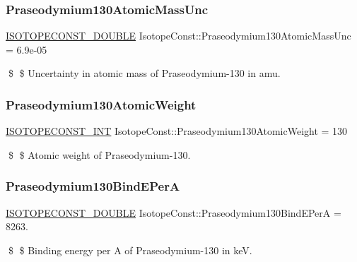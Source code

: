 \subsubsection{\texorpdfstring{Praseodymium130\+Atomic\+Mass\+Unc}{Praseodymium130AtomicMassUnc}}
{\footnotesize\ttfamily \mbox{\hyperlink{group___isotope_const-_macros_ga8f45a7272ce02c0b4c65c44636ed719a}{I\+S\+O\+T\+O\+P\+E\+C\+O\+N\+S\+T\+\_\+\+D\+O\+U\+B\+LE}} Isotope\+Const\+::\+Praseodymium130\+Atomic\+Mass\+Unc = 6.\+9e-\/05}

\$ \$ Uncertainty in atomic mass of Praseodymium-\/130 in amu. \mbox{\label{group___isotope_const-_praseodymium-_pr130_ga55f72d8e8ccb86345a1d28e09d85a3bc}} 
\subsubsection{\texorpdfstring{Praseodymium130\+Atomic\+Weight}{Praseodymium130AtomicWeight}}
{\footnotesize\ttfamily \mbox{\hyperlink{group___isotope_const-_macros_ga5f18360b3e99483a35c32d789e62621c}{I\+S\+O\+T\+O\+P\+E\+C\+O\+N\+S\+T\+\_\+\+I\+NT}} Isotope\+Const\+::\+Praseodymium130\+Atomic\+Weight = 130}

\$ \$ Atomic weight of Praseodymium-\/130. \mbox{\label{group___isotope_const-_praseodymium-_pr130_gaa9226fcb0eb995f440b5b230f6cd5bdf}} 
\subsubsection{\texorpdfstring{Praseodymium130\+Bind\+E\+PerA}{Praseodymium130BindEPerA}}
{\footnotesize\ttfamily \mbox{\hyperlink{group___isotope_const-_macros_ga8f45a7272ce02c0b4c65c44636ed719a}{I\+S\+O\+T\+O\+P\+E\+C\+O\+N\+S\+T\+\_\+\+D\+O\+U\+B\+LE}} Isotope\+Const\+::\+Praseodymium130\+Bind\+E\+PerA = 8263.}

\$ \$ Binding energy per A of Praseodymium-\/130 in keV. \mbox{\label{group___isotope_const-_praseodymium-_pr130_ga38a71445af66cfab2474daf3984a8bfd}} 
